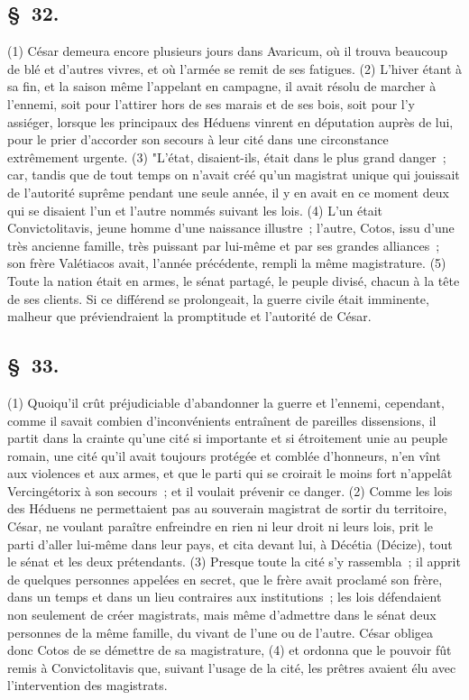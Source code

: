 \documentclass[french,twoside]{book} %
\begin{document}
\subsection[{§ 32.}]{ \textsc{§ 32.} }
\noindent (1) César demeura encore plusieurs jours dans Avaricum, où il trouva beaucoup de blé et d’autres vivres, et où l’armée se remit de ses fatigues. (2) L'hiver étant à sa fin, et la saison même l’appelant en campagne, il avait résolu de marcher à l’ennemi, soit pour l’attirer hors de ses marais et de ses bois, soit pour l’y assiéger, lorsque les principaux des Héduens vinrent en députation auprès de lui, pour le prier d’accorder son secours à leur cité dans une circonstance extrêmement urgente. (3) "L'état, disaient-ils, était dans le plus grand danger ; car, tandis que de tout temps on n’avait créé qu’un magistrat unique qui jouissait de l’autorité suprême pendant une seule année, il y en avait en ce moment deux qui se disaient l’un et l’autre nommés suivant les lois. (4) L'un était Convictolitavis, jeune homme d’une naissance illustre ; l’autre, Cotos, issu d’une très ancienne famille, très puissant par lui-même et par ses grandes alliances ; son frère Valétiacos avait, l’année précédente, rempli la même magistrature. (5) Toute la nation était en armes, le sénat partagé, le peuple divisé, chacun à la tête de ses clients. Si ce différend se prolongeait, la guerre civile était imminente, malheur que préviendraient la promptitude et l’autorité de César.
\subsection[{§ 33.}]{ \textsc{§ 33.} }
\noindent (1) Quoiqu’il crût préjudiciable d’abandonner la guerre et l’ennemi, cependant, comme il savait combien d’inconvénients entraînent de pareilles dissensions, il partit dans la crainte qu’une cité si importante et si étroitement unie au peuple romain, une cité qu’il avait toujours protégée et comblée d’honneurs, n’en vînt aux violences et aux armes, et que le parti qui se croirait le moins fort n’appelât Vercingétorix à son secours ; et il voulait prévenir ce danger. (2) Comme les lois des Héduens ne permettaient pas au souverain magistrat de sortir du territoire, César, ne voulant paraître enfreindre en rien ni leur droit ni leurs lois, prit le parti d’aller lui-même dans leur pays, et cita devant lui, à Décétia (Décize), tout le sénat et les deux prétendants. (3) Presque toute la cité s’y rassembla ; il apprit de quelques personnes appelées en secret, que le frère avait proclamé son frère, dans un temps et dans un lieu contraires aux institutions ; les lois défendaient non seulement de créer magistrats, mais même d’admettre dans le sénat deux personnes de la même famille, du vivant de l’une ou de l’autre. César obligea donc Cotos de se démettre de sa magistrature, (4) et ordonna que le pouvoir fût remis à Convictolitavis que, suivant l’usage de la cité, les prêtres avaient élu avec l’intervention des magistrats.
\end{document}

